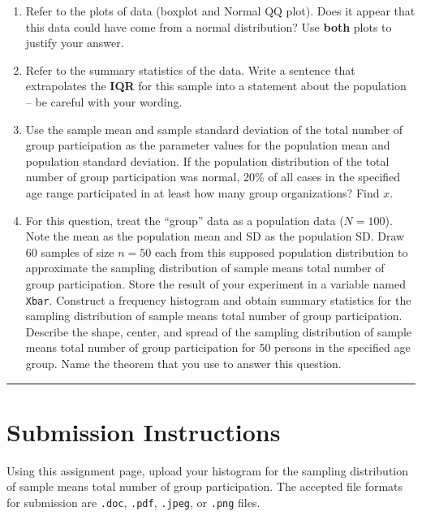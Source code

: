 \documentclass[oneside,openany]{book}
\begin{document}
\begin{enumerate}
\def\labelenumi{\arabic{enumi}.}
\item
  Refer to the plots of data (boxplot and Normal QQ plot). Does it appear that this data could have come from a normal distribution? Use \textbf{both} plots to justify your answer.
\item
  Refer to the summary statistics of the data. Write a sentence that extrapolates the \textbf{IQR} for this sample into a statement about the population -- be careful with your wording.
\item
  Use the sample mean and sample standard deviation of the total number of group participation as the parameter values for the population mean and population standard deviation. If the population distribution of the total number of group participation was normal, 20\% of all cases in the specified age range participated in at least how many group organizations? Find \(x\).
\item
  For this question, treat the ``group'' data as a population data (\(N = 100\)). Note the mean as the population mean and SD as the population SD. Draw 60 samples of size \(n = 50\) each from this supposed population distribution to approximate the sampling distribution of sample means total number of group participation. Store the result of your experiment in a variable named \texttt{Xbar}. Construct a frequency histogram and obtain summary statistics for the sampling distribution of sample means total number of group participation. Describe the shape, center, and spread of the sampling distribution of sample means total number of group participation for 50 persons in the specified age group. Name the theorem that you use to answer this question.
\end{enumerate}

\begin{center}\rule{0.5\linewidth}{0.5pt}\end{center}

\section{Submission Instructions}\label{submission-instructions}

Using this assignment page, upload your histogram for the sampling distribution of sample means total number of group participation. The accepted file formats for  submission are \texttt{.doc}, \texttt{.pdf}, \texttt{.jpeg}, or \texttt{.png} files.
\end{document}
